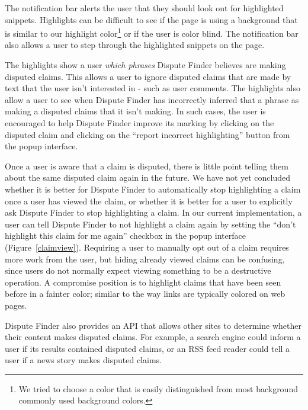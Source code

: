 \documentclass{www2010-submission}
\newcommand{\todo}[1]{}
\begin{document}
The notification bar alerts the user that they should look out for highlighted snippets. Highlights can be difficult to see if the page is using a background that is similar to our highlight color\footnote{We tried to choose a color that is easily distinguished from most background commonly used background colors.} or if the user is color blind. The notification bar also allows a user to step through the highlighted snippets on the page.

The highlights show a user {\it which phrases} Dispute Finder believes are making disputed claims. This allows a user to ignore disputed claims that are made by text that the user isn't interested in - such as user comments. The highlights also allow a user to see when Dispute Finder has incorrectly inferred that a phrase as making a disputed claims that it isn't making. In such cases, the user is encouraged to help Dispute Finder improve its marking by clicking on the disputed claim and clicking on the ``report incorrect highlighting'' button from the popup interface.

Once a user is aware that a claim is disputed, there is little point telling them about the same disputed claim again in the future. We have not yet concluded whether it is better for Dispute Finder to automatically stop highlighting a claim once a user has viewed the claim, or whether it is better for a user to explicitly ask Dispute Finder to stop highlighting a claim. In our current implementation, a user can tell Dispute Finder to not highlight a claim again by setting the ``don't highlight this claim for me again'' checkbox in the popup interface (Figure~\ref{claimview}). Requiring a user to manually opt out of a claim requires more work from the user, but hiding already viewed claims can be confusing, since users do not normally expect viewing something to be a destructive operation. A compromise position is to highlight claims that have been seen before in a fainter color; similar to the way links are typically colored on web pages.

\todo{Try using a fainter color}

\todo{Text is wrong in the screenshot}

Dispute Finder also provides an API that allows other sites to determine whether their content makes disputed claims. For example, a search engine could inform a user if its results contained disputed claims, or an RSS feed reader could tell a user if a news story makes disputed claims.

\todo{Document API online}
\todo{Change the highlight color to yellow? Auto-adjust highlight color based on background color?}
\todo{Should we automatically adjust the highlight color, based on the background color of the page}
\todo{Discuss previous work on highlighting here, rather than in related work?}
\end{document}
